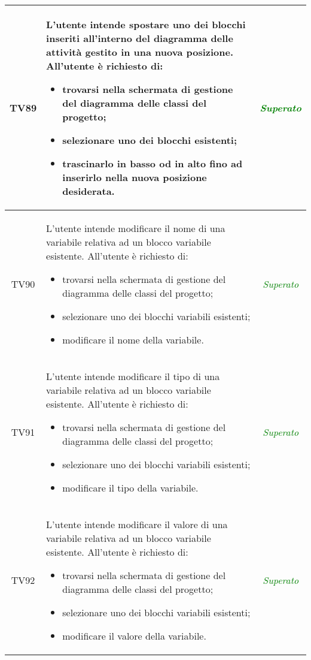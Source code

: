 \begin{longtable}{|c|>{}m{8cm}|c|}
\hypertarget{TV4.19}{TV89} & L'utente intende spostare uno dei blocchi inseriti all’interno del diagramma delle attività gestito in una nuova posizione.
All'utente è richiesto di:
\begin{itemize}
	\item trovarsi nella schermata di gestione del diagramma delle classi del progetto;
	\item selezionare uno dei blocchi esistenti;
	\item trascinarlo in basso od in alto fino ad inserirlo nella nuova posizione desiderata.
\end{itemize} & \textcolor{Green}{\textit{Superato}}\\ \hline

\hypertarget{TV4.20.1}{TV90} & L'utente intende modificare il nome di una variabile relativa ad un blocco variabile esistente.
All'utente è richiesto di:
\begin{itemize}
	\item trovarsi nella schermata di gestione del diagramma delle classi del progetto;
	\item selezionare uno dei blocchi variabili esistenti;
	\item modificare il nome della variabile.
\end{itemize} & \textcolor{Green}{\textit{Superato}}\\ \hline

\hypertarget{TV4.20.2}{TV91} & L'utente intende modificare il tipo di una variabile relativa ad un blocco variabile esistente.
All'utente è richiesto di:
\begin{itemize}
	\item trovarsi nella schermata di gestione del diagramma delle classi del progetto;
	\item selezionare uno dei blocchi variabili esistenti;
	\item modificare il tipo della variabile.
\end{itemize} & \textcolor{Green}{\textit{Superato}}\\ \hline

\hypertarget{TV4.20.3}{TV92} & L'utente intende modificare il valore di una variabile relativa ad un blocco variabile esistente.
All'utente è richiesto di:
\begin{itemize}
	\item trovarsi nella schermata di gestione del diagramma delle classi del progetto;
	\item selezionare uno dei blocchi variabili esistenti;
	\item modificare il valore della variabile.
\end{itemize} & \textcolor{Green}{\textit{Superato}}\\ \hline


\end{longtable}
